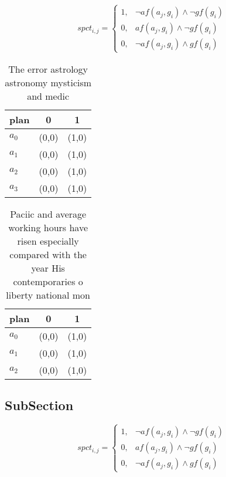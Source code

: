 \documentclass[a4paper]{article}
\begin{document}
\begin{equation}
spct_{i,j} =
\begin{cases}
1, & \text{$\neg af(a_j,g_i) \wedge \neg gf(g_i)$}\\
0, & \text{$af(a_j,g_i) \wedge \neg gf(g_i)$}\\
0, & \text{$\neg af(a_j,g_i) \wedge gf(g_i)$}
\end{cases}
\end{equation}

\begin{table}
\begin{adjustbox}{width=0.7\columnwidth}
\begin{tabular}{|l|l|l|}
\hline
\textbf{plan} & \multicolumn{1}{c|}{\textbf{0}} & \multicolumn{1}{c|}{\textbf{1}} \\ \hline
\textbf{$a_0$}  & (0,0) & (1,0) \\ \hline
\textbf{$a_1$}  & (0,0) & (1,0) \\ \hline
\textbf{$a_2$}  & (0,0) & (1,0) \\ \hline
\textbf{$a_3$}  & (0,0) & (1,0) \\ \hline
\end{tabular}
\end{adjustbox}
\caption{The error astrology astronomy mysticism and medic
}
\end{table}

\begin{table}
\begin{adjustbox}{width=0.7\columnwidth}
\begin{tabular}{|l|l|l|}
\hline
\textbf{plan} & \multicolumn{1}{c|}{\textbf{0}} & \multicolumn{1}{c|}{\textbf{1}} \\ \hline
\textbf{$a_0$}  & (0,0) & (1,0) \\ \hline
\textbf{$a_1$}  & (0,0) & (1,0) \\ \hline
\textbf{$a_2$}  & (0,0) & (1,0) \\ \hline
\end{tabular}
\end{adjustbox}
\caption{Paciic and average working hours have risen especially compared with the year His contemporaries o liberty national mon
}
\end{table}

\subsection{SubSection}

\begin{equation}
spct_{i,j} =
\begin{cases}
1, & \text{$\neg af(a_j,g_i) \wedge \neg gf(g_i)$}\\
0, & \text{$af(a_j,g_i) \wedge \neg gf(g_i)$}\\
0, & \text{$\neg af(a_j,g_i) \wedge gf(g_i)$}
\end{cases}
\end{equation}
\end{document}
